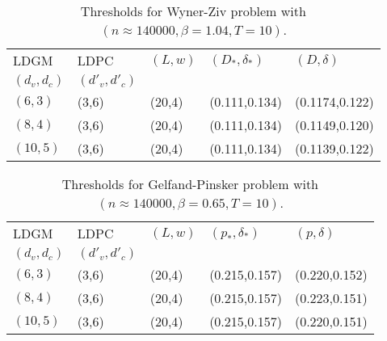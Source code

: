 \begin{table}[thb]
\begin{center}
\caption{Thresholds for Wyner-Ziv problem with $(n\approx 140000,\beta=1.04,T=10)$.}
\label{table:wyner_ziv}
\vspace{-1mm}
\begin{tabular}{|p{0.8cm}|p{0.8cm}|p{0.7cm}|p{1.6cm}|p{1.65cm}|}
\hline
LDGM & LDPC & $(L,w)$ & $(D_{*},\delta_{*})$ & $(D,\delta)$ \\
$(d_v,d_c)$ & $(d'_v,d'_c)$ &  &  & \\
\hline
$(6,3)$ & (3,6) & (20,4)  & (0.111,0.134)  & (0.1174,0.122) \\
$(8,4)$ & (3,6) & (20,4)  & (0.111,0.134)  & (0.1149,0.120) \\
$(10,5)$ & (3,6) & (20,4)  & (0.111,0.134)  & (0.1139,0.122) \\
\hline  
\end{tabular}
\end{center}
\vspace{-0.65cm}
\end{table}

\begin{table}[thb]
\begin{center}
\caption{Thresholds for Gelfand-Pinsker problem with $(n\approx 140000,\beta=0.65,T=10)$.} 
\label{table:gelfand_pinsker}
\vspace{-1mm}
\begin{tabular}{|p{1.4cm}|p{0.8cm}|p{0.8cm}|p{1.4cm}|p{1.4cm}|}
\hline
LDGM & LDPC & $(L,w)$ & $(p_{*},\delta_{*})$ & $(p,\delta)$ \\
$(d_v,d_c)$ & $(d'_v,d'_c)$ &  &  & \\
\hline
$(6,3)$ & (3,6) & (20,4)  & (0.215,0.157)  & (0.220,0.152) \\
$(8,4)$ & (3,6) & (20,4)  & (0.215,0.157)  & (0.223,0.151) \\
$(10,5)$ & (3,6) & (20,4)  & (0.215,0.157)  & (0.220,0.151) \\
\hline
\end{tabular}
\end{center}
\vspace{-0.5cm}
\end{table}

